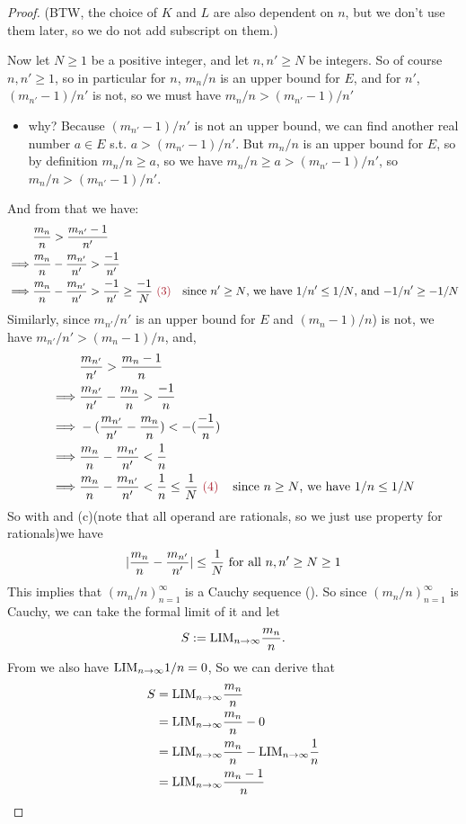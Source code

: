 \begin{proof}
(BTW, the choice of \(K\) and \(L\) are also dependent on \(n\), but we don't use them later, so we do not add subscript on them.)

Now let \(N \ge 1\) be a positive integer, and let \(n, n' \ge N\) be integers.
So of course \(n, n' \ge 1\), so in particular for \(n\), \(m_n/n\) is an upper bound for \(E\), and for \(n'\), \((m_{n'} - 1)/n'\) is not, so we must have \(m_n/n > (m_{n'} - 1)/n'\)
\begin{itemize}
    \item
        why?
        Because \((m_{n'} - 1)/n'\) is not an upper bound, we can find another real number \(a \in E\) s.t. \(a > (m_{n'} - 1)/n'\).
        But \(m_n/n\) is an upper bound for \(E\), so by definition \(m_n/n \ge a\), so we have \(m_n/n \ge a > (m_{n'} - 1)/n'\), so \(m_n/n > (m_{n'} - 1)/n'\).
\end{itemize}
And from that we have:
\begin{align*}
             & \frac{m_n}{n} > \frac{m_{n'} - 1}{n'} \\
    \implies & \frac{m_n}{n} - \frac{m_{n'}}{n'} > \frac{-1}{n'} \\
    \implies & \frac{m_n}{n} - \frac{m_{n'}}{n'} > \frac{-1}{n'} \ge \frac{-1}{N} \MAROON{\ (3)} & \text{since \(n' \ge N\), we have \(1/n' \le 1/N\), and \(-1/n' \ge -1/N\)}
\end{align*}
Similarly, since \(m_{n'}/n'\) is an upper bound for \(E\) and \((m_n - 1)/n\)) is not, we have \(m_{n'}/n' > (m_n - 1)/n\), and,
\begin{align*}
             & \frac{m_{n'}}{n'} > \frac{m_n - 1}{n} \\
    \implies & \frac{m_{n'}}{n'} - \frac{m_n}{n} > \frac{-1}{n} \\
    \implies & -(\frac{m_{n'}}{n'} - \frac{m_n}{n}) < -(\frac{-1}{n}) \\
    \implies & \frac{m_n}{n} - \frac{m_{n'}}{n'} < \frac{1}{n} \\
    \implies & \frac{m_n}{n} - \frac{m_{n'}}{n'} < \frac{1}{n} \le \frac{1}{N} \MAROON{\ (4)} & \text{since \(n \ge N\), we have \(1/n \le 1/N\)}
\end{align*}
So with  and (c)(note that all operand are rationals, so we just use property for rationals)we have
\[
    \lvert\frac{m_n}{n} - \frac{m_{n'}}{n'}\rvert \le \frac{1}{N} \text{ for all } n, n' \ge N \ge 1
\]
This implies that \((m_n/n)_{n = 1}^{\infty}\) is a Cauchy sequence ().
So since \((m_n/n)_{n = 1}^{\infty}\) is Cauchy, we can take the formal limit of it and let
\[
    S := \text{LIM}_{n \to \infty}\frac{m_n}{n}.
\]
From  we also have \(\text{LIM}_{n \to \infty}1/n = 0\), So we can derive that
\begin{align*}
    S & = \text{LIM}_{n \to \infty}\frac{m_n}{n} \\
      & = \text{LIM}_{n \to \infty}\frac{m_n}{n} - 0 \\
      & = \text{LIM}_{n \to \infty}\frac{m_n}{n} - \text{LIM}_{n \to \infty}\frac{1}{n} \\
      & = \text{LIM}_{n \to \infty}\frac{m_n - 1}{n}
\end{align*}


\end{proof}
